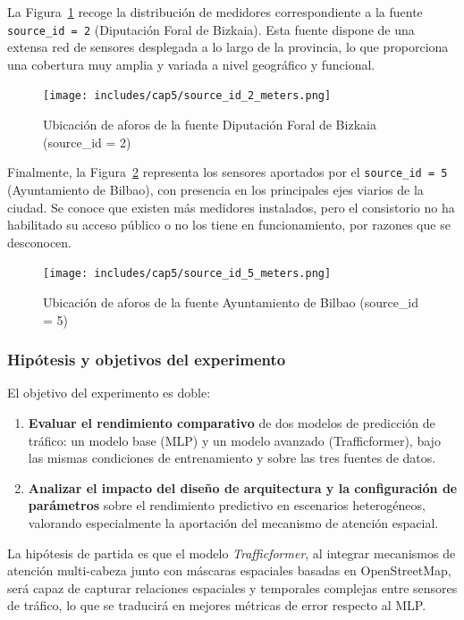La Figura~\ref{fig:sourceid2_map} recoge la distribución de medidores correspondiente a la fuente \texttt{source\_id = 2} (Diputación Foral de Bizkaia). Esta fuente dispone de una extensa red de sensores desplegada a lo largo de la provincia, lo que proporciona una cobertura muy amplia y variada a nivel geográfico y funcional.

\begin{figure}[H]
	\centering
	\texttt{[image: includes/cap5/source\_id\_2\_meters.png]}
	\caption{Ubicación de aforos de la fuente Diputación Foral de Bizkaia (source\_id = 2)}
	\label{fig:sourceid2_map}
\end{figure}

Finalmente, la Figura~\ref{fig:sourceid5_map} representa los sensores aportados por el \texttt{source\_id = 5} (Ayuntamiento de Bilbao), con presencia en los principales ejes viarios de la ciudad. Se conoce que existen más medidores instalados, pero el consistorio no ha habilitado su acceso público o no los tiene en funcionamiento, por razones que se desconocen.

\begin{figure}[H]
	\centering
	\texttt{[image: includes/cap5/source\_id\_5\_meters.png]}
	\caption{Ubicación de aforos de la fuente Ayuntamiento de Bilbao (source\_id = 5)}
	\label{fig:sourceid5_map}
\end{figure}

\subsubsection{Hipótesis y objetivos del experimento}

El objetivo del experimento es doble:

\begin{enumerate}
	\item \textbf{Evaluar el rendimiento comparativo} de dos modelos de predicción de tráfico: un modelo base (MLP) y un modelo avanzado (Trafficformer), bajo las mismas condiciones de entrenamiento y sobre las tres fuentes de datos.
	\item \textbf{Analizar el impacto del diseño de arquitectura y la configuración de parámetros} sobre el rendimiento predictivo en escenarios heterogéneos, valorando especialmente la aportación del mecanismo de atención espacial.
\end{enumerate}

La hipótesis de partida es que el modelo \textit{Trafficformer}, al integrar mecanismos de atención multi-cabeza junto con máscaras espaciales basadas en OpenStreetMap, será capaz de capturar relaciones espaciales y temporales complejas entre sensores de tráfico, lo que se traducirá en mejores métricas de error respecto al MLP.

